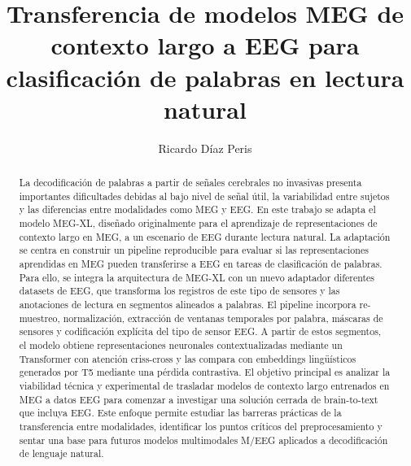 \documentclass[11pt,spanish,listoffigures,listoftables]{tfgetsinf}
\title{Transferencia de modelos MEG de contexto largo a EEG para clasificación de palabras en lectura natural
}
\author{Ricardo Díaz Peris}
\begin{document}

\begin{abstract}
La decodificación de palabras a partir de señales cerebrales no invasivas presenta importantes dificultades debidas al bajo nivel de señal útil, la variabilidad entre sujetos y las diferencias entre modalidades como MEG y EEG. En este trabajo se adapta el modelo MEG-XL, diseñado originalmente para el aprendizaje de representaciones de contexto largo en MEG, a un escenario de EEG durante lectura natural. La adaptación se centra en construir un pipeline reproducible para evaluar si las representaciones aprendidas en MEG pueden transferirse a EEG en tareas de clasificación de palabras.
Para ello, se integra la arquitectura de MEG-XL con un nuevo adaptador diferentes datasets de EEG, que transforma los registros de este tipo de sensores y las anotaciones de lectura en segmentos alineados a palabras. El pipeline incorpora re-muestreo, normalización, extracción de ventanas temporales por palabra, máscaras de sensores y codificación explícita del tipo de sensor EEG. A partir de estos segmentos, el modelo obtiene representaciones neuronales contextualizadas mediante un Transformer con atención criss-cross y las compara con embeddings lingüísticos generados por T5 mediante una pérdida contrastiva.
El objetivo principal es analizar la viabilidad técnica y experimental de trasladar modelos de contexto largo entrenados en MEG a datos EEG para comenzar a investigar una solución cerrada de brain-to-text que incluya EEG. Este enfoque permite estudiar las barreras prácticas de la transferencia entre modalidades, identificar los puntos críticos del preprocesamiento y sentar una base para futuros modelos multimodales M/EEG aplicados a decodificación de lenguaje natural.
\end{abstract}
\end{document}
